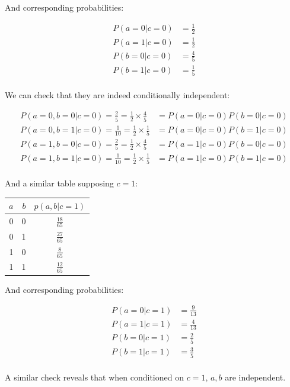 \documentclass{article}
\begin{document}
And corresponding probabilities:

\begin{align*}
    P(a = 0 | c = 0) &= \frac{1}{2} \\
    P(a = 1 | c = 0) &= \frac{1}{2} \\
    P(b = 0 | c = 0) &= \frac{4}{5} \\
    P(b = 1 | c = 0) &= \frac{1}{5} \\
\end{align*}

We can check that they are indeed conditionally independent:

\begin{align*}
    P(a = 0, b = 0 | c = 0) = \frac{2}{5} = \frac{1}{2} \times \frac{4}{5} &= P(a = 0 | c = 0) P(b = 0 | c = 0) \\
    P(a = 0, b = 1 | c = 0) = \frac{1}{10} = \frac{1}{2} \times \frac{1}{5} &= P(a = 0 | c = 0) P(b = 1 | c = 0) \\
    P(a = 1, b = 0 | c = 0) = \frac{2}{5} = \frac{1}{2} \times \frac{4}{5} &= P(a = 1 | c = 0) P(b = 0 | c = 0) \\
    P(a = 1, b = 1 | c = 0) = \frac{1}{10} = \frac{1}{2} \times \frac{1}{5} &= P(a = 1 | c = 0) P(b = 1 | c = 0) \\
\end{align*}

And a similar table supposing $ c = 1 $:

\begin{tabular}{r r | c }
	$ a $ & $ b $ & $ p(a, b | c = 1) $\\
	\hline
	0 & 0 & $ \frac{18}{65} $ \\
	0 & 1 & $ \frac{27}{65} $ \\
	1 & 0 & $ \frac{8}{65} $ \\
	1 & 1 & $ \frac{12}{65} $ \\
\end{tabular}

And corresponding probabilities:

\begin{align*}
    P(a = 0 | c = 1) &= \frac{9}{13} \\
    P(a = 1 | c = 1) &= \frac{4}{13} \\
    P(b = 0 | c = 1) &= \frac{2}{5} \\
    P(b = 1 | c = 1) &= \frac{3}{5} \\
\end{align*}

A similar check reveals that when conditioned on $ c = 1 $, $a, b$ 
are independent.
\end{document}
